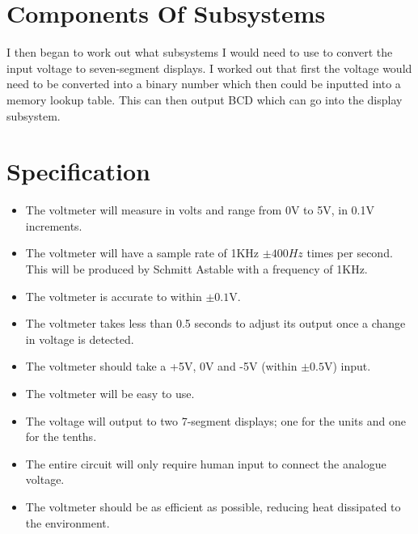 \section{Components Of Subsystems}
I then began to work out what subsystems I would need to use to convert the input voltage to seven-segment displays. I worked out that first the voltage would need to be converted into a binary number which then could be inputted into a memory lookup table. This can then output BCD which can go into the display subsystem.
\section{Specification}
\begin{itemize}
    \item The voltmeter will measure in volts and range from 0V to 5V, in 0.1V increments.
    \item The voltmeter will have a sample rate of 1KHz $\pm 400Hz$ times per second. This will be produced by Schmitt Astable with a frequency of 1KHz.
    \item The voltmeter is accurate to within $\pm0.1\mathrm{V}$.
    \item The voltmeter takes less than 0.5 seconds to adjust its output once a change in voltage is detected.
    \item The voltmeter should take a +5V, 0V and -5V (within $\pm0.5\mathrm{V}$) input.
    \item The voltmeter will be easy to use.
    \item The voltage will output to two 7-segment displays; one for the units and one for the tenths.
    \item The entire circuit will only require human input to connect the analogue voltage.
    \item The voltmeter should be as efficient as possible, reducing heat dissipated to the environment.
\end{itemize}